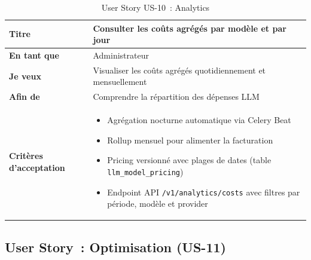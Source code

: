 \begin{table}[H]
\centering
\caption{User Story US-10~: Analytics}
\label{tab:us10}
\begin{tabularx}{\textwidth}{|l|X|}
\hline
\textbf{Titre} & Consulter les coûts agrégés par modèle et par jour \\
\hline
\textbf{En tant que} & Administrateur \\
\hline
\textbf{Je veux} & Visualiser les coûts agrégés quotidiennement et mensuellement \\
\hline
\textbf{Afin de} & Comprendre la répartition des dépenses LLM \\
\hline
\textbf{Critères d'acceptation} & \begin{minipage}[t]{\linewidth}\vspace{2pt}
\begin{itemize}[noitemsep,topsep=0pt]
\item Agrégation nocturne automatique via Celery Beat~\cite{celery2024}
\item Rollup mensuel pour alimenter la facturation
\item Pricing versionné avec plages de dates (table \texttt{llm\_model\_pricing})
\item Endpoint API \texttt{/v1/analytics/costs} avec filtres par période, modèle et provider
\end{itemize}\vspace{2pt}
\end{minipage} \\
\hline
\end{tabularx}
\end{table}

\subsection{User Story~: Optimisation (US-11)}

